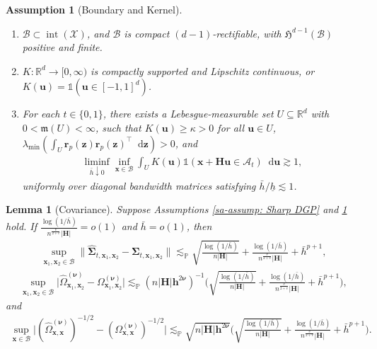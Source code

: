 \documentclass[10pt,a4paper]{amsart}
\newtheorem{assumption}{Assumption}
\newtheorem{lem}{Lemma}
\newcommand{\A}{\mathcal{A}}
\newcommand{\B}{\mathcal{B}}
\newcommand{\Haus}{\mathfrak{H}}
\newcommand{\Indicator}{\mathds{1}}
\newcommand{\X}{\mathcal{X}}
\newcommand{\bH}{\mathbf{H}}
\newcommand{\bSigma}{\boldsymbol{\Sigma}}
\newcommand{\bh}{\mathbf{h}}
\newcommand{\bnu}{\boldsymbol{\nu}}
\newcommand{\br}{\mathbf{r}}
\newcommand{\bu}{\mathbf{u}}
\newcommand{\bx}{\mathbf{x}}
\newcommand{\bz}{\mathbf{z}}
\newcommand{\dif}{\mathop{}\!\mathrm{d}}
\newcommand{\leb}{\mathfrak{m}}
\newcommand{\lessp}{\lesssim_{\mathbb{P}}}
\newcommand{\reals}{\mathbb{R}}
\DeclareMathOperator{\setint}{int}
\begin{document}
\begin{assumption}[Boundary and Kernel]\label{sa-assump: Boundary and Kernel} $ $
    \begin{enumerate}[label=\normalfont(\roman*)]
    \item $\B\subset\setint(\X)$, and $\B$ is compact $(d-1)$-rectifiable, with $\Haus^{d-1}(\B)$ positive and finite.
    \item $K: \reals^d \to [0,\infty)$ is compactly supported and Lipschitz continuous, or $K(\bu) = \Indicator(\bu \in [-1,1]^d)$.
    \item For each $t \in \{0,1\}$, there exists a Lebesgue-measurable set $U \subseteq \reals^d$ with $0<\leb(U)<\infty$, such that $K(\bu) \geq \kappa > 0$ for all $\bu \in U$, $\lambda_{\min} (\int_U \br_p(\bz) \br_p(\bz)^{\top} \dif \bz) > 0$, and
    \begin{align*}
        \liminf_{\bar{h} \downarrow 0}\inf_{\bx \in \B} \int_{U} K(\bu) \Indicator(\bx + \bH \bu \in \A_t) \dif \bu \gtrsim 1,
    \end{align*}
    uniformly over diagonal bandwidth matrices satisfying $\bar{h}/\underline h\lesssim1$.
    \end{enumerate}
\end{assumption}

\begin{lem}[Covariance]\label{sa-lem: covariance}
    Suppose Assumptions \ref{sa-assump: Sharp DGP} and \ref{sa-assump: Boundary and Kernel} hold. If $\frac{\log(1/\bar{h})}{n^{\frac{v}{2+v}} |\bH|} = o(1)$ and $\bar{h}=o(1)$, then
    \begin{align*}
        \sup_{\bx_1,\bx_2 \in \B} \big\|\widehat{\bSigma}_{t, \bx_1,\bx_2} - \bSigma_{t, \bx_1,\bx_2}\big\|
        \lessp \sqrt{\frac{\log(1/\bar{h})}{n |\bH|}} + \frac{\log(1/\bar{h})}{n^{\frac{v}{2+v}}|\bH|} + \bar{h}^{p+1},
    \end{align*}
    \begin{align*}
        \sup_{\bx_1,\bx_2 \in \B} \big|\widehat{\Omega}_{\bx_1,\bx_2}^{(\bnu)} - \Omega_{\bx_1,\bx_2}^{(\bnu)}\big|
        \lessp (n |\bH|\bh^{2\bnu})^{-1}\bigg(\sqrt{\frac{\log(1/\bar{h})}{n |\bH|}} + \frac{\log(1/\bar{h})}{n^{\frac{v}{2+v}}|\bH|}+ \bar{h}^{p+1}\bigg),
    \end{align*}
    and
    \begin{align*}
        \sup_{\bx \in \B} \big|(\widehat{\Omega}_{\bx,\bx}^{(\bnu)})^{-1/2} - (\Omega_{\bx,\bx}^{(\bnu)})^{-1/2} \big|
        \lessp \sqrt{n |\bH|\bh^{2\bnu}}\bigg(\sqrt{\frac{\log(1/\bar{h})}{n |\bH|}} + \frac{\log(1/\bar{h})}{n^{\frac{v}{2+v}}|\bH|} + \bar{h}^{p+1}\bigg).
    \end{align*}
\end{lem}
\end{document}
